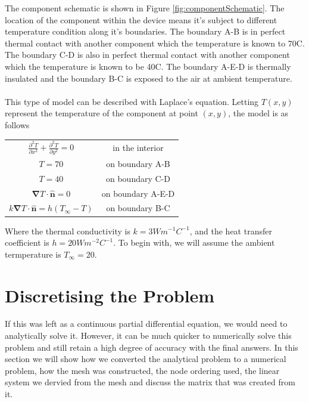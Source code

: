\documentclass[12pt,a4paper]{article}
\begin{document}
The component schematic is shown in Figure \ref{fig:componentSchematic}. The location of the component within the device means it's subject to different temperature condition along it's boundaries. The boundary A-B is in perfect thermal contact with another component which the temperature is known to 70\degree C. The boundary C-D is also in perfect thermal contact with another component which the temperature is known to be 40\degree C. The boundary A-E-D is thermally insulated and the boundary B-C is exposed to the air at ambient temperature.
\\\\
This type of model can be described with Laplace's equation. Letting $T(x,y)$ represent the temperature of the component at point $(x, y)$, the model is as follows	

\begin{center}
\begin{tabular}{c c}
$\frac{\partial^2 T}{\partial x^2}+\frac{\partial^2 T}{\partial y^2}=0$ & in the interior\\
$T = 70$ & on boundary A-B \\
$T = 40$ & on boundary C-D \\
$\boldsymbol{\nabla} T \cdot {\hat{\textbf{n}}} = 0$ & on boundary A-E-D\\
$k\boldsymbol{\nabla}T\cdot\hat{\textbf{n}} = h(T_{\infty} - T)$ & on boundary B-C
\end{tabular}
\end{center}
Where the thermal conductivity is $k=3Wm^{-1}C^{-1}$, and the heat transfer coefficient is $h=20 Wm^{-2}C^{-1}$. To begin with, we will assume the ambient termperature is $T_\infty = 20$.
\clearpage
\section{Discretising the Problem}
If this was left as a continuous partial differential equation, we would need to analytically solve it. However, it can be much quicker to numerically solve this problem and still retain a high degree of accuracy with the final answers. In this section we will show how we converted the analytical problem to a numerical problem, how the mesh was constructed, the node ordering used, the linear system we dervied from the mesh and discuss the matrix that was created from it.
\end{document}
